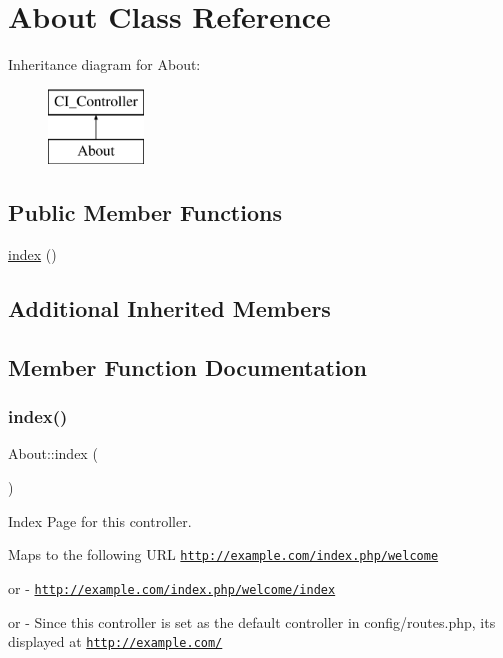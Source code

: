 \hypertarget{class_about}{}\section{About Class Reference}
\label{class_about}
Inheritance diagram for About\+:\begin{figure}[H]
\begin{center}
\leavevmode
\includegraphics[height=2.000000cm]{class_about}
\end{center}
\end{figure}
\subsection*{Public Member Functions}
\begin{DoxyCompactItemize}
\item 
\mbox{\hyperlink{class_about_a814f18bad46e7d0ef1f37943ab342b6a}{index}} ()
\end{DoxyCompactItemize}
\subsection*{Additional Inherited Members}


\subsection{Member Function Documentation}
\mbox{\label{class_about_a814f18bad46e7d0ef1f37943ab342b6a}} 
\subsubsection{\texorpdfstring{index()}{index()}}
{\footnotesize\ttfamily About\+::index (\begin{DoxyParamCaption}{ }\end{DoxyParamCaption})}

Index Page for this controller.

Maps to the following U\+RL \href{http://example.com/index.php/welcome}{\tt http\+://example.\+com/index.\+php/welcome}
\begin{DoxyItemize}
\item or -\/ \href{http://example.com/index.php/welcome/index}{\tt http\+://example.\+com/index.\+php/welcome/index}
\item or -\/ Since this controller is set as the default controller in config/routes.\+php, it\textquotesingle{}s displayed at \href{http://example.com/}{\tt http\+://example.\+com/}
\end{DoxyItemize}

